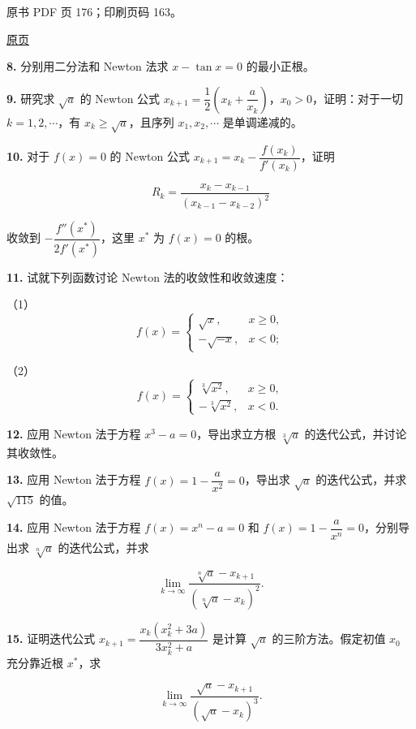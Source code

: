 \clearpage

原书 PDF 页 176；印刷页码 163。

\href{source-images/pdf-176.jpeg}{原页}

\textbf{8.} 分别用二分法和 Newton 法求 \(x-\tan x=0\) 的最小正根。

\textbf{9.} 研究求 \(\sqrt{a}\) 的 Newton 公式 \(x_{k+1}=\dfrac{1}{2}\left(x_k+\dfrac{a}{x_k}\right)\)，\(x_0>0\)，证明：对于一切 \(k=1,2,\cdots\)，有 \(x_k\geqslant\sqrt{a}\)，且序列 \(x_1,x_2,\cdots\) 是单调递减的。

\textbf{10.} 对于 \(f(x)=0\) 的 Newton 公式 \(x_{k+1}=x_k-\dfrac{f(x_k)}{f'(x_k)}\)，证明

\[
R_k=\frac{x_k-x_{k-1}}{(x_{k-1}-x_{k-2})^2}
\]

收敛到 \(-\dfrac{f''(x^*)}{2f'(x^*)}\)，这里 \(x^*\) 为 \(f(x)=0\) 的根。

\textbf{11.} 试就下列函数讨论 Newton 法的收敛性和收敛速度：

（1） \[
f(x)=\begin{cases}
\sqrt{x},&x\geqslant0,\\
-\sqrt{-x},&x<0;
\end{cases}
\]

（2） \[
f(x)=\begin{cases}
\sqrt[3]{x^2},&x\geqslant0,\\
-\sqrt[3]{x^2},&x<0.
\end{cases}
\]

\textbf{12.} 应用 Newton 法于方程 \(x^3-a=0\)，导出求立方根 \(\sqrt[3]{a}\) 的迭代公式，并讨论其收敛性。

\textbf{13.} 应用 Newton 法于方程 \(f(x)=1-\dfrac{a}{x^2}=0\)，导出求 \(\sqrt{a}\) 的迭代公式，并求 \(\sqrt{115}\) 的值。

\textbf{14.} 应用 Newton 法于方程 \(f(x)=x^n-a=0\) 和 \(f(x)=1-\dfrac{a}{x^n}=0\)，分别导出求 \(\sqrt[n]{a}\) 的迭代公式，并求

\[
\lim_{k\to\infty}\frac{\sqrt[n]{a}-x_{k+1}}{(\sqrt[n]{a}-x_k)^2}.
\]

\textbf{15.} 证明迭代公式 \(x_{k+1}=\dfrac{x_k(x_k^2+3a)}{3x_k^2+a}\) 是计算 \(\sqrt{a}\) 的三阶方法。假定初值 \(x_0\) 充分靠近根 \(x^*\)，求

\[
\lim_{k\to\infty}\frac{\sqrt{a}-x_{k+1}}{(\sqrt{a}-x_k)^3}.
\]

